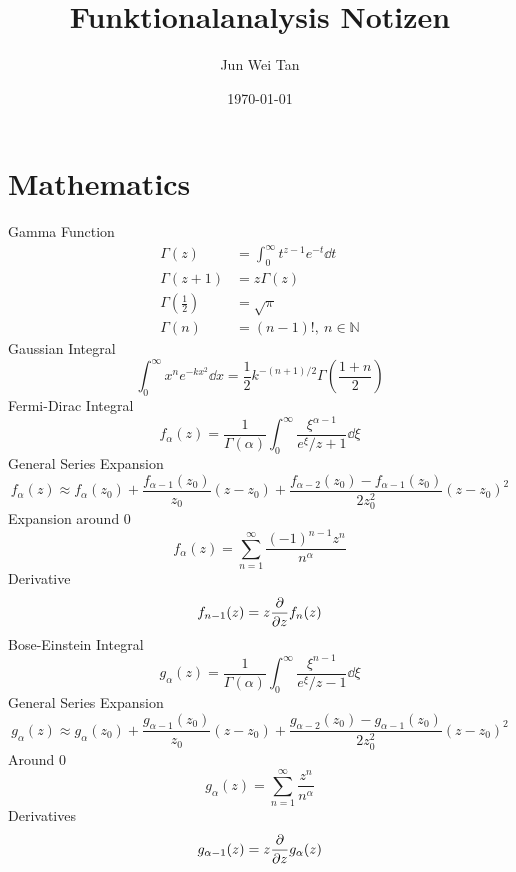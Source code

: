 \documentclass[prb,12pt]{revtex4-2}
\theoremstyle{definition}
\theoremstyle{definition}
\theoremstyle{definition}
\newcommand{\N}{\mathbb{N}}
\begin{document}
	\title{Funktionalanalysis Notizen}
	\author{Jun Wei Tan}
	\date{\today}
	\maketitle
	\section{Mathematics}
	Gamma Function
	\begin{align*}
		\Gamma(z)&=\int_0^\infty t^{z-1}e^{-t}\dd{t}\\
		\Gamma(z+1)&=z\Gamma(z)\\
		\Gamma\left(\frac 12\right)&=\sqrt{\pi}\\
		\Gamma(n)&=(n-1)!,~n\in \N
	\end{align*}
	Gaussian Integral
	\[\int_0^\infty x^n e^{-k x^2}\dd{x} = \frac 12 k^{-(n+1)/2}\Gamma\left(\frac{1+n}{2}\right)\]
	Fermi-Dirac Integral
	\[f_\alpha(z) =\frac 1{\Gamma(\alpha)}\int_0^\infty \frac{\xi^{\alpha-1}}{e^{\xi}/z + 1}\dd{\xi}\]
	General Series Expansion
	\[f_\alpha(z) \approx f_\alpha(z_0) + \frac{f_{\alpha - 1}(z_0)}{z_0}(z-z_0)+\frac{f_{\alpha -2}(z_0) - f_{\alpha - 1}(z_0)}{2z_0^2}(z-z_0)^2\]
	Expansion around 0
	\[f_\alpha(z) = \sum_{n=1}^\infty \frac{(-1)^{n-1}z^n}{n^\alpha}\]
	Derivative
	\[f_{n-1}(z) =z\pdv{z}f_n(z)\]
	Bose-Einstein Integral
	\[g_\alpha(z) = \frac{1}{\Gamma(\alpha)}\int_0^\infty \frac{\xi^{n-1}}{e^\xi/z-1}\dd{\xi}\]
	General Series Expansion
	\[g_\alpha(z) \approx g_\alpha(z_0) + \frac{g_{\alpha - 1}(z_0)}{z_0}(z-z_0)+\frac{g_{\alpha -2}(z_0) - g_{\alpha - 1}(z_0)}{2z_0^2}(z-z_0)^2\]
	Around 0
	\[g_\alpha(z)=\sum_{n=1}^\infty\frac{z^n}{n^\alpha}\]
	Derivatives
	\[g_{\alpha - 1}(z) =z\pdv{z}g_\alpha(z)\]
\end{document}
